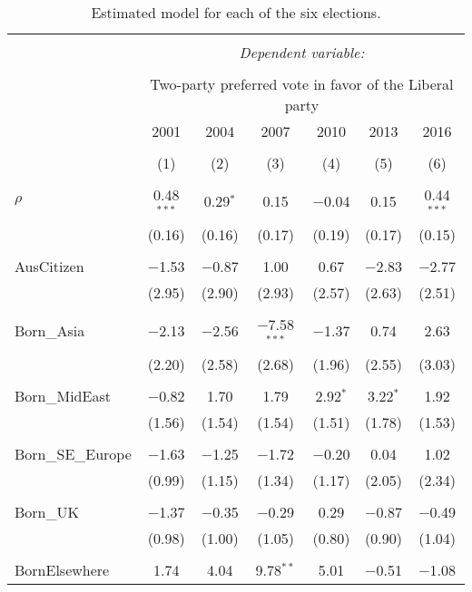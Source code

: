 \documentclass[openany]{book}
\begin{document}
\begin{table}[!htbp] \centering 
  \caption{Estimated model for each of the six elections.} 
  \label{} 
\tiny 
\begin{tabular}{@{\extracolsep{1pt}}lcccccc} 
\\[-1.8ex]\hline 
\hline \\[-1.8ex] 
 & \multicolumn{6}{c}{\textit{Dependent variable:}} \\ 
\cline{2-7} 
\\[-1.8ex] & \multicolumn{6}{c}{Two-party preferred vote in favor of the Liberal party} \\ 
 & 2001 & 2004 & 2007 & 2010 & 2013 & 2016 \\ 
\\[-1.8ex] & (1) & (2) & (3) & (4) & (5) & (6)\\ 
\hline \\[-1.8ex] 
 $\rho$ & 0.48$^{***}$ & 0.29$^{*}$ & 0.15 & $-$0.04 & 0.15 & 0.44$^{***}$ \\ 
  & (0.16) & (0.16) & (0.17) & (0.19) & (0.17) & (0.15) \\ 
  & & & & & & \\ 
 AusCitizen & $-$1.53 & $-$0.87 & 1.00 & 0.67 & $-$2.83 & $-$2.77 \\ 
  & (2.95) & (2.90) & (2.93) & (2.57) & (2.63) & (2.51) \\ 
  & & & & & & \\ 
 Born\_Asia & $-$2.13 & $-$2.56 & $-$7.58$^{***}$ & $-$1.37 & 0.74 & 2.63 \\ 
  & (2.20) & (2.58) & (2.68) & (1.96) & (2.55) & (3.03) \\ 
  & & & & & & \\ 
 Born\_MidEast & $-$0.82 & 1.70 & 1.79 & 2.92$^{*}$ & 3.22$^{*}$ & 1.92 \\ 
  & (1.56) & (1.54) & (1.54) & (1.51) & (1.78) & (1.53) \\ 
  & & & & & & \\ 
 Born\_SE\_Europe & $-$1.63 & $-$1.25 & $-$1.72 & $-$0.20 & 0.04 & 1.02 \\ 
  & (0.99) & (1.15) & (1.34) & (1.17) & (2.05) & (2.34) \\ 
  & & & & & & \\ 
 Born\_UK & $-$1.37 & $-$0.35 & $-$0.29 & 0.29 & $-$0.87 & $-$0.49 \\ 
  & (0.98) & (1.00) & (1.05) & (0.80) & (0.90) & (1.04) \\ 
  & & & & & & \\ 
 BornElsewhere & 1.74 & 4.04 & 9.78$^{**}$ & 5.01 & $-$0.51 & $-$1.08 \\ 

\end{tabular}
\end{table}
\end{document}
